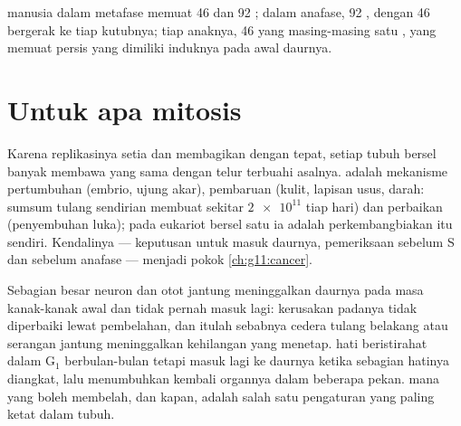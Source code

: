 \begin{example}\label{ex:g11:cell-cycle-mitosis:human}
 manusia dalam metafase memuat 46  dan 92 ; dalam
anafase, 92 , dengan 46 bergerak ke tiap kutubnya; tiap
anaknya, 46  yang masing-masing satu , yang memuat
persis  yang dimiliki induknya pada awal daurnya.
\end{example}

\section{Untuk apa mitosis}

\begin{proposition}\label{prop:g11:cell-cycle-mitosis:conformity}
Karena replikasinya setia dan  membagikan  dengan
tepat, setiap  tubuh bersel banyak membawa  yang
sama dengan  telur terbuahi asalnya.  adalah mekanisme
pertumbuhan (embrio, ujung akar), pembaruan (kulit, lapisan usus,
darah: sumsum tulang sendirian membuat sekitar $\num{2e11}$  tiap
hari) dan perbaikan (penyembuhan luka); pada eukariot bersel satu ia
adalah perkembangbiakan itu sendiri. Kendalinya --- keputusan untuk
masuk daurnya, pemeriksaan sebelum S dan sebelum anafase --- menjadi
pokok \cref{ch:g11:cancer}.
\end{proposition}
\admitted

\begin{remark}\label{rem:g11:cell-cycle-mitosis:notall}
Sebagian besar neuron dan  otot jantung meninggalkan daurnya pada
masa kanak-kanak awal dan tidak pernah masuk lagi: kerusakan padanya
tidak diperbaiki lewat pembelahan, dan itulah sebabnya cedera tulang
belakang atau serangan jantung meninggalkan kehilangan yang menetap.
 hati beristirahat dalam $\mathrm{G_1}$ berbulan-bulan tetapi masuk
lagi ke daurnya ketika sebagian hatinya diangkat, lalu menumbuhkan
kembali organnya dalam beberapa pekan.  mana yang boleh membelah,
dan kapan, adalah salah satu pengaturan yang paling ketat dalam tubuh.
\end{remark}

